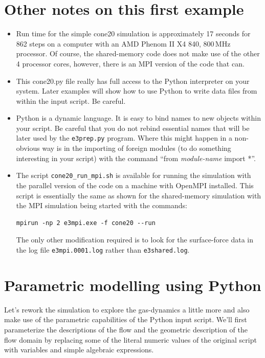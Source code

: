 \section{Other notes on this first example}
\begin{itemize}
\item Run time for the simple cone20 simulation 
      is approximately 17 seconds for 862 steps on a computer with 
      an AMD Phenom II X4 840, 800\,MHz processor.
      Of course, the shared-memory code does not make use of the other 4 processor cores,
      however, there is an MPI version of the code that can.

\item This cone20.py file really has full access to the Python interpreter
      on your system.  Later examples will show how to use Python to write
      data files from within the input script.  Be careful.

\item Python is a dynamic language.
      It is easy to bind names to new objects within your script.
      Be careful that you do not rebind essential names that will be
      later used by the \texttt{e3prep.py} program.
      Where this might happen in a non-obvious way is in the importing
      of foreign modules (to do something interesting in your script)
      with the command ``from \textit{module-name} import *''.

\item The script \texttt{cone20\_run\_mpi.sh} is available for running the simulation
  with the parallel version of the code on a machine with OpenMPI installed.
  This script is essentially the same as shown for the shared-memory simulation
  with the MPI simulation being started with the commands:
\begin{verbatim}
mpirun -np 2 e3mpi.exe -f cone20 --run
\end{verbatim}
  The only other modification required is to look for the surface-force data in the
  log file \texttt{e3mpi.0001.log} rather than \texttt{e3shared.log}.

\end{itemize}

\clearpage
\section{Parametric modelling using Python}
%
Let's rework the simulation to explore the gas-dynamics a little more and also
make use of the parametric capabilities of the Python input script.
We'll first parameterize the descriptions of the flow and the geometric description
of the flow domain by replacing some of the literal numeric values of the original script
with variables and simple algebraic expressions.

